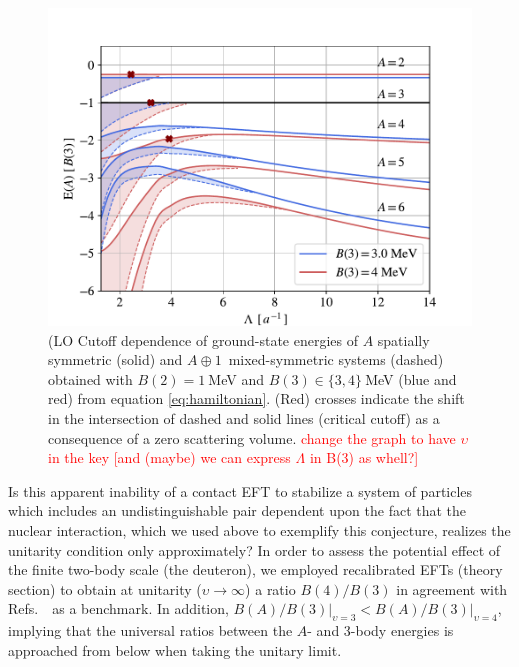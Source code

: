 \documentclass[preprint,12pt]{elsarticle}
\newcommand{\abb}{\mbox{\ensuremath{A\oplus 1}}}
\newcommand{\red}[1]{\textcolor{red}{#1}}
\begin{document}
%
\begin{figure}
    \centering
        \centering
        \includegraphics[width=\linewidth]{./p-systems-vs-l} 
        \caption{(LO Cutoff dependence of ground-state energies of $A$ spatially symmetric (solid) and \abb~mixed-symmetric systems
        (dashed) obtained with $B(2)=1~$MeV and \mbox{$B(3)\in\lbrace3,4\rbrace~$MeV} (blue and red) from equation \ref{eq:hamiltonian}. 
        (Red) crosses indicate the shift in the intersection of dashed and solid lines (critical cutoff) as a consequence of
        a zero scattering volume. 
        \red{change the graph to have $\upsilon$ in the key [and (maybe) we can express $\Lambda$ in B(3) as whell?] }}
        \label{fig:threshold}
\end{figure} 
%

Is this apparent inability of a contact EFT to stabilize a system of particles
which includes an undistinguishable pair dependent upon the fact that the nuclear interaction,
which we used above to exemplify this conjecture, realizes the unitarity condition only
approximately?
In order to assess the potential effect of the finite two-body scale (the deuteron),
we employed recalibrated EFTs (theory section) to obtain
at unitarity ($\upsilon\rightarrow \infty$) a ratio $B(4)/B(3)$ in agreement with 
Refs.~\cite{Hammer:2006ct,2009NatPh...5..417V}~as a benchmark.
In addition, \mbox{$B(A)/B(3)\Big\vert_{\upsilon=3}<B(A)/B(3)\Big\vert_{\upsilon=4}$}, implying that the universal ratios between the $A$- and 3-body energies is approached from below when taking the unitary limit.
\end{document}
